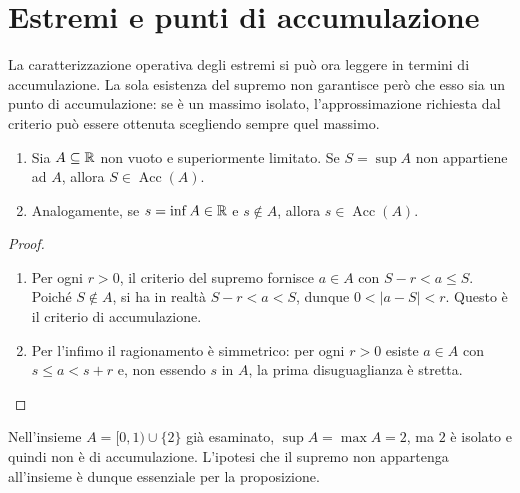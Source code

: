 \section{Estremi e punti di accumulazione}

La caratterizzazione operativa degli estremi si può ora leggere in termini di accumulazione. La sola esistenza del supremo non garantisce però che esso sia un punto di accumulazione: se è un massimo isolato, l'approssimazione richiesta dal criterio può essere ottenuta scegliendo sempre quel massimo.

\begin{proposizione}
\begin{enumerate}[label=\arabic*.]
\item Sia $A\subseteq\mathbb{R}$ non vuoto e superiormente limitato. Se $S=\sup A$ non appartiene ad $A$, allora $S\in\operatorname{Acc}(A)$.
\item Analogamente, se $s=\inf A\in\mathbb{R}$ e $s\notin A$, allora $s\in\operatorname{Acc}(A)$.
\end{enumerate}
\end{proposizione}
\begin{proof}
\begin{enumerate}[label=\arabic*.]
\item Per ogni $r>0$, il criterio del supremo fornisce $a\in A$ con $S-r<a\le S$. Poiché $S\notin A$, si ha in realtà $S-r<a<S$, dunque $0<|a-S|<r$. Questo è il criterio di accumulazione.
\item Per l'infimo il ragionamento è simmetrico: per ogni $r>0$ esiste $a\in A$ con $s\le a<s+r$ e, non essendo $s$ in $A$, la prima disuguaglianza è stretta.
\end{enumerate}
\end{proof}

\begin{esempio}
Nell'insieme $A=[0,1)\cup\{2\}$ già esaminato, $\sup A=\max A=2$, ma $2$ è isolato e quindi non è di accumulazione. L'ipotesi che il supremo non appartenga all'insieme è dunque essenziale per la proposizione.
\end{esempio}

